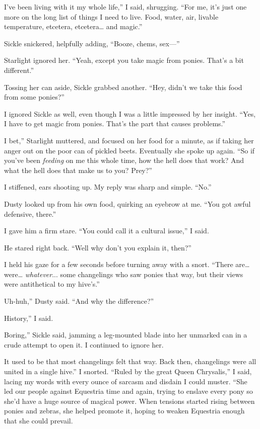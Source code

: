 \leavevmode{}I’ve been living with it my whole life,” I said, shrugging. “For me, it’s just one more on the long list of things I need to live. Food, water, air, livable temperature, etcetera, etcetera… and magic.”

Sickle snickered, helpfully adding, “Booze, chems, sex—”

Starlight ignored her. “Yeah, except you take magic from ponies. That’s a bit different.”

Tossing her can aside, Sickle grabbed another. “Hey, didn’t we take this food from some ponies?”

I ignored Sickle as well, even though I was a little impressed by her insight. “Yes, I have to get magic from ponies. That’s the part that causes problems.”

\leavevmode{}I bet,” Starlight muttered, and focused on her food for a minute, as if taking her anger out on the poor can of pickled beets. Eventually she spoke up again. “So if you’ve been \textit{feeding} on me this whole time, how the hell does that work? And what the hell does that make us to you? Prey?”

I stiffened, ears shooting up. My reply was sharp and simple. “No.”

Dusty looked up from his own food, quirking an eyebrow at me. “You got awful defensive, there.”

I gave him a firm stare. “You could call it a cultural issue,” I said.

He stared right back. “Well why don’t you explain it, then?”

I held his gaze for a few seconds before turning away with a snort. “There are… were… \textit{whatever}... some changelings who saw ponies that way, but their views were antithetical to my hive’s.”

\leavevmode{}Uh-huh,” Dusty said. “And why the difference?”

\leavevmode{}History,” I said.

\leavevmode{}Boring,” Sickle said, jamming a leg-mounted blade into her unmarked can in a crude attempt to open it. I continued to ignore her.

\leavevmode{}It used to be that most changelings felt that way. Back then, changelings were all united in a single hive.” I snorted. “Ruled by the great Queen Chrysalis,” I said, lacing my words with every ounce of sarcasm and disdain I could muster. “She led our people against Equestria time and again, trying to enslave every pony so she’d have a huge source of magical power. When tensions started rising between ponies and zebras, she helped promote it, hoping to weaken Equestria enough that she could prevail.

